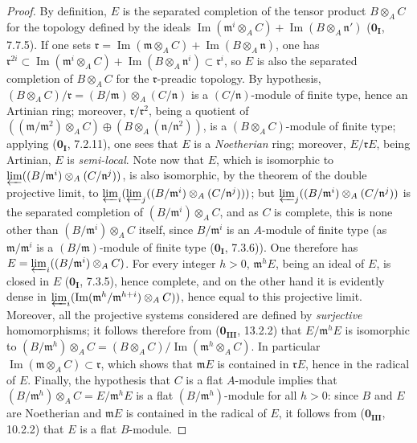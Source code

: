 \begin{proof}
By definition, $E$ is the separated completion of the tensor product $B\otimes_A C$ for the topology defined by the ideals $\operatorname{Im}(\mathfrak{m}^i\otimes_A C)+\operatorname{Im}(B\otimes_A \mathfrak{n}')$ ($\mathbf{0_I}$, 7.7.5).
If one sets $\mathfrak{r}=\operatorname{Im}(\mathfrak{m}\otimes_A C)+\operatorname{Im}(B\otimes_A \mathfrak{n})$, one has $\mathfrak{r}^{2i}\subset\operatorname{Im}(\mathfrak{m}^i\otimes_A C)+\operatorname{Im}(B\otimes_A \mathfrak{n}^i)\subset\mathfrak{r}^i$, so $E$ is also the separated completion of $B\otimes_A C$ for the $\mathfrak{r}$-preadic topology.
By hypothesis, $(B\otimes_A C)/\mathfrak{r}=(B/\mathfrak{m})\otimes_A (C/\mathfrak{n})$ is a $(C/\mathfrak{n})$-module of finite type, hence an Artinian ring;
moreover, $\mathfrak{r}/\mathfrak{r}^2$, being a quotient of $((\mathfrak{m}/\mathfrak{m}^2)\otimes_A C)\oplus(B\otimes_A (\mathfrak{n}/\mathfrak{n}^2))$, is a $(B\otimes_A C)$-module of finite type; applying ($\mathbf{0_I}$, 7.2.11), one sees that $E$ is a \emph{Noetherian} ring; moreover, $E/\mathfrak{r}E$, being Artinian, $E$ is \emph{semi-local}.
Note now that $E$, which is isomorphic to $\varprojlim((B/\mathfrak{m}^i)\otimes_A(C/\mathfrak{n}^j))$, is also isomorphic, by the theorem
of the double projective limit, to $\varprojlim_i(\varprojlim_j((B/\mathfrak{m}^i)\otimes_A (C/\mathfrak{n}^j)))$; but $\varprojlim_j((B/\mathfrak{m}^i)\otimes_A (C/\mathfrak{n}^j))$
is the separated completion of $(B/\mathfrak{m}^i)\otimes_A C$, and as $C$ is complete, this is none other than $(B/\mathfrak{m}^i)\otimes_A C$ itself, since $B/\mathfrak{m}^i$ is an $A$-module of finite type (as $\mathfrak{m}/\mathfrak{m}^i$ is a $(B/\mathfrak{m})$-module of finite type ($\mathbf{0_I}$, 7.3.6)).
One therefore has $E=\varprojlim_i((B/\mathfrak{m}^i)\otimes_A C)$.
For every integer $h>0$, $\mathfrak{m}^h E$, being an ideal of $E$, is closed in $E$ ($\mathbf{0_I}$, 7.3.5), hence complete, and on the other hand it is evidently dense in $\varprojlim_i(\operatorname{Im}(\mathfrak{m}^h/\mathfrak{m}^{h+i})\otimes_A C))$, hence equal to this projective limit.
Moreover, all the projective systems considered are defined by \emph{surjective} homomorphisms; it follows therefore from ($\mathbf{0_{III}}$, 13.2.2) that $E/\mathfrak{m}^h E$ is isomorphic to $(B/\mathfrak{m}^h)\otimes_A C = (B\otimes_A C)/\operatorname{Im}(\mathfrak{m}^h\otimes_A C)$.
In particular $\operatorname{Im}(\mathfrak{m}\otimes_A C)\subset\mathfrak{r}$, which shows that $\mathfrak{m}E$ is contained in $\mathfrak{r}E$, hence in the radical of $E$.
Finally, the hypothesis that $C$ is a flat $A$-module implies that $(B/\mathfrak{m}^h)\otimes_A C = E/\mathfrak{m}^h E$ is a flat $(B/\mathfrak{m}^h)$-module for all $h>0$: since $B$ and $E$ are Noetherian and $\mathfrak{m}E$ is contained in the radical of $E$, it follows from ($\mathbf{0_{III}}$, 10.2.2) that $E$ is a flat $B$-module.
\end{proof}


